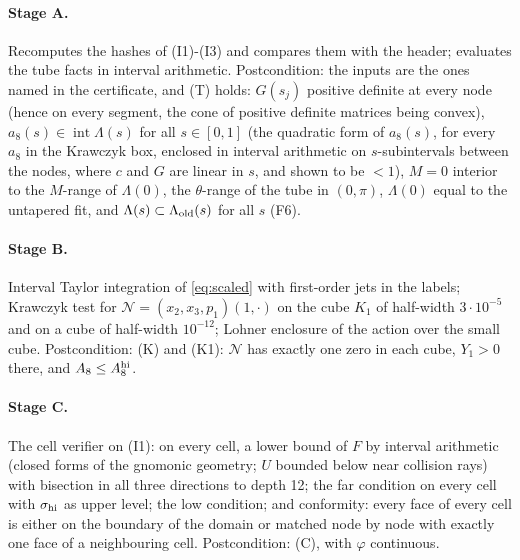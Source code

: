 \paragraph{Stage A.} Recomputes the hashes of (I1)-(I3) and compares them with the header; evaluates the tube facts in
interval arithmetic. Postcondition: the inputs are the ones named in the certificate, and (T) holds: $G(s_j)$ positive
definite at every node (hence on every segment, the cone of positive definite matrices being convex),
$a_8(s)\in\operatorname{int}\Lambda(s)$ for all $s\in[0,1]$ (the quadratic form of $a_8(s)$, for every $a_8$ in the
Krawczyk box, enclosed in interval arithmetic on $s$-subintervals between the nodes, where $c$ and $G$ are linear in $s$,
and shown to be $<1$), $M=0$ interior to the $M$-range of
$\Lambda(0)$, the $\theta$-range of the tube in $(0,\pi)$, $\Lambda(0)$ equal to the untapered fit, and
$\Lambda(s)\subset\Lambda_{\rm old}(s)$ for all $s$ (F6).

\paragraph{Stage B.} Interval Taylor integration of \eqref{eq:scaled} with first-order jets in the labels; Krawczyk
test for $\mathcal N=(x_2,x_3,p_1)(1,\cdot)$ on the cube $K_1$ of half-width $3\cdot10^{-5}$ and on a cube of half-width
$10^{-12}$; Lohner enclosure of the action over the small cube. Postcondition: (K) and (K1): $\mathcal N$ has exactly one
zero in each cube, $Y_1>0$ there, and $A_8\le A_8^{\rm hi}$.

\paragraph{Stage C.} The cell verifier on (I1): on every cell, a lower bound of $F$ by interval arithmetic (closed
forms of the gnomonic geometry; $U$ bounded below near collision rays) with bisection in all three directions to depth
12; the far condition on every cell with $\sigma_{\rm hi}$ as upper level; the low condition; and conformity: every
face of every cell is either on the boundary of the domain or matched node by node with exactly one face of a
neighbouring cell. Postcondition: (C), with $\varphi$ continuous.

